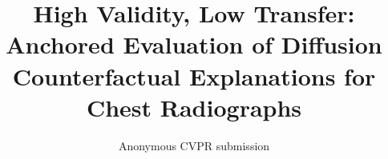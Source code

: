 \documentclass[10pt,twocolumn,letterpaper]{article}
\title{High Validity, Low Transfer: Anchored Evaluation of Diffusion Counterfactual Explanations for Chest Radiographs}
\author{Anonymous CVPR submission}
\begin{document}
\maketitle









{
    \small
    
    
}
\end{document}
